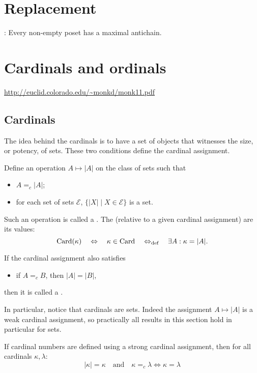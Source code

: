 \chapter{Replacement}

: Every non-empty poset has a maximal antichain.

\chapter{Cardinals and ordinals}
\url{http://euclid.colorado.edu/~monkd/monk11.pdf}
\section{Cardinals}

The idea behind the cardinals is to have a set of objects that witnesses the size, or potency, of sets. These two conditions define the cardinal assignment.
\begin{definition}
Define an operation $A\mapsto |A|$ on the class of sets such that
\begin{itemize}
\item $A=_c |A|$;
\item for each set of sets $\mathcal{E}$, $\{ |X|\;|\; X\in\mathcal{E} \}$ is a set.
\end{itemize}
Such an operation is called a . The  (relative to a given
cardinal assignment) are its values:
\[ \operatorname{Card}(\kappa) \quad\Leftrightarrow\quad \kappa \in \operatorname{Card} \quad\Leftrightarrow_{\text{def}}\quad \exists A: \kappa = |A|. \]

If the cardinal assignment also satisfies
\begin{itemize}
\item if $A=_c B$, then $|A|=|B|$,
\end{itemize}
then it is called a .
\end{definition}
In particular, notice that cardinals are sets. Indeed the assignment $A\mapsto |A|$ is a weak cardinal assignment, so practically all results in this section hold in particular for sets.

\begin{lemma}
If cardinal numbers are defined using a strong cardinal assignment, then for all cardinals $\kappa,\lambda$:
\[ |\kappa| = \kappa \quad \text{and}\quad \kappa =_c\lambda \iff \kappa = \lambda \]
\end{lemma}

